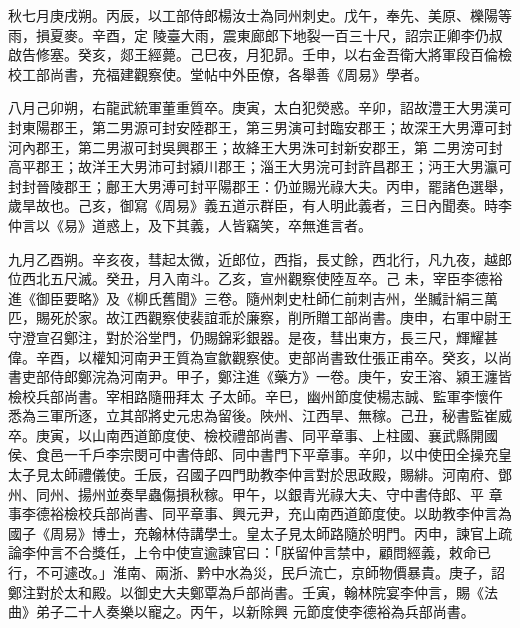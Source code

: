 \begin{pinyinscope}
 秋七月庚戌朔。丙辰，以工部侍郎楊汝士為同州刺史。戊午，奉先、美原、櫟陽等雨，損夏麥。辛酉，定
 陵臺大雨，震東廊郎下地裂一百三十尺，詔宗正卿李仍叔啟告修塞。癸亥，郯王經薨。己巳夜，月犯昴。壬申，以右金吾衛大將軍段百倫檢校工部尚書，充福建觀察使。堂帖中外臣僚，各舉善《周易》學者。



 八月己卯朔，右龍武統軍董重質卒。庚寅，太白犯熒惑。辛卯，詔故澧王大男漢可封東陽郡王，第二男源可封安陸郡王，第三男演可封臨安郡王；故深王大男潭可封河內郡王，第二男淑可封吳興郡王；故絳王大男洙可封新安郡王，第
 二男滂可封高平郡王；故洋王大男沛可封潁川郡王；淄王大男浣可封許昌郡王；沔王大男瀛可封封晉陵郡王；鄜王大男溥可封平陽郡王：仍並賜光祿大夫。丙申，罷諸色選舉，歲旱故也。己亥，御寫《周易》義五道示群臣，有人明此義者，三日內聞奏。時李仲言以《易》道惑上，及下其義，人皆竊笑，卒無進言者。



 九月乙酉朔。辛亥夜，彗起太微，近郎位，西指，長丈餘，西北行，凡九夜，越郎位西北五尺滅。癸丑，月入南斗。乙亥，宣州觀察使陸亙卒。己
 未，宰臣李德裕進《御臣要略》及《柳氏舊聞》三卷。隨州刺史杜師仁前刺吉州，坐贓計絹三萬匹，賜死於家。故江西觀察使裴誼乖於廉察，削所贈工部尚書。庚申，右軍中尉王守澄宣召鄭注，對於浴堂門，仍賜錦彩銀器。是夜，彗出東方，長三尺，輝耀甚偉。辛酉，以權知河南尹王質為宣歙觀察使。吏部尚書致仕張正甫卒。癸亥，以尚書吏部侍郎鄭浣為河南尹。甲子，鄭注進《藥方》一卷。庚午，安王溶、潁王瀍皆檢校兵部尚書。宰相路隨冊拜太
 子太師。辛巳，幽州節度使楊志誠、監軍李懷仵悉為三軍所逐，立其部將史元忠為留後。陜州、江西旱、無稼。己丑，秘書監崔威卒。庚寅，以山南西道節度使、檢校禮部尚書、同平章事、上柱國、襄武縣開國侯、食邑一千戶李宗閔可中書侍郎、同中書門下平章事。辛卯，以中使田全操充皇太子見太師禮儀使。壬辰，召國子四門助教李仲言對於思政殿，賜緋。河南府、鄧州、同州、揚州並奏旱蟲傷損秋稼。甲午，以銀青光祿大夫、守中書侍郎、平
 章事李德裕檢校兵部尚書、同平章事、興元尹，充山南西道節度使。以助教李仲言為國子《周易》博士，充翰林侍講學士。皇太子見太師路隨於明門。丙申，諫官上疏論李仲言不合獎任，上令中使宣逾諫官曰：「朕留仲言禁中，顧問經義，敕命已行，不可遽改。」淮南、兩浙、黔中水為災，民戶流亡，京師物價暴貴。庚子，詔鄭注對於太和殿。以御史大夫鄭覃為戶部尚書。壬寅，翰林院宴李仲言，賜《法曲》弟子二十人奏樂以寵之。丙午，以新除興
 元節度使李德裕為兵部尚書。




\end{pinyinscope}
